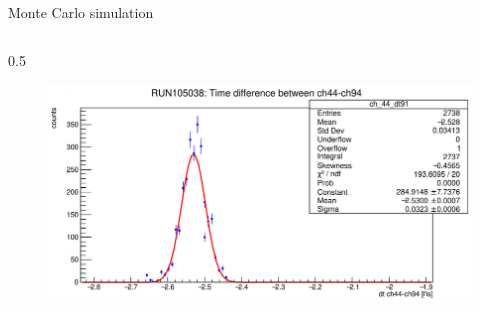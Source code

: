 \documentclass{beamer}
\begin{document}
\begin{frame}{Monte Carlo simulation}
\begin{columns}
\begin{column}{0.5\framewidth}
\begin{figure}[H]
      \label{fig:delay1}
    \end{figure}
    \begin{figure}[H]
          \centering
      \includegraphics[width=\columnwidth]{figures/png/Screenshot from 2023-12-03 11-50-33.png}

      \label{fig:delay2}
    \end{figure}
       \end{column}
      
   \end{columns}
    \end{frame}
\end{document}
